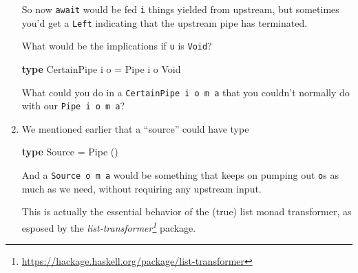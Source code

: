 \documentclass[]{article}
\newenvironment{Shaded}{}{}
\newcommand{\DataTypeTok}[1]{\textcolor[rgb]{0.56,0.13,0.00}{#1}}
\newcommand{\FunctionTok}[1]{\textcolor[rgb]{0.02,0.16,0.49}{#1}}
\newcommand{\KeywordTok}[1]{\textcolor[rgb]{0.00,0.44,0.13}{\textbf{#1}}}
\newcommand{\NormalTok}[1]{#1}
\newcommand{\OperatorTok}[1]{\textcolor[rgb]{0.40,0.40,0.40}{#1}}
\newcommand{\OtherTok}[1]{\textcolor[rgb]{0.00,0.44,0.13}{#1}}
\renewcommand{\href}[2]{#2\footnote{\url{#1}}}
\begin{document}
\begin{enumerate}
\begin{Shaded}
\end{Shaded}

  So now \texttt{await} would be fed \texttt{i} things yielded from upstream,
  but sometimes you'd get a \texttt{Left} indicating that the upstream pipe has
  terminated.

  What would be the implications if \texttt{u} is \texttt{Void}?

\begin{Shaded}
\begin{Highlighting}[]
\KeywordTok{type} \DataTypeTok{CertainPipe}\NormalTok{ i o }\OtherTok{=} \DataTypeTok{Pipe}\NormalTok{ i o }\DataTypeTok{Void}
\end{Highlighting}
\end{Shaded}

  What could you do in a \texttt{CertainPipe\ i\ o\ m\ a} that you couldn't
  normally do with our \texttt{Pipe\ i\ o\ m\ a}?
\item
  We mentioned earlier that a ``source'' could have type

\begin{Shaded}
\begin{Highlighting}[]
\KeywordTok{type} \DataTypeTok{Source} \OtherTok{=} \DataTypeTok{Pipe}\NormalTok{ ()}
\end{Highlighting}
\end{Shaded}

  And a \texttt{Source\ o\ m\ a} would be something that keeps on pumping out
  \texttt{o}s as much as we need, without requiring any upstream input.

  This is actually the essential behavior of the (true) list monad transformer,
  as esposed by the
  \emph{\href{https://hackage.haskell.org/package/list-transformer}{list-transformer}}
  package.


\end{enumerate}
\end{document}
